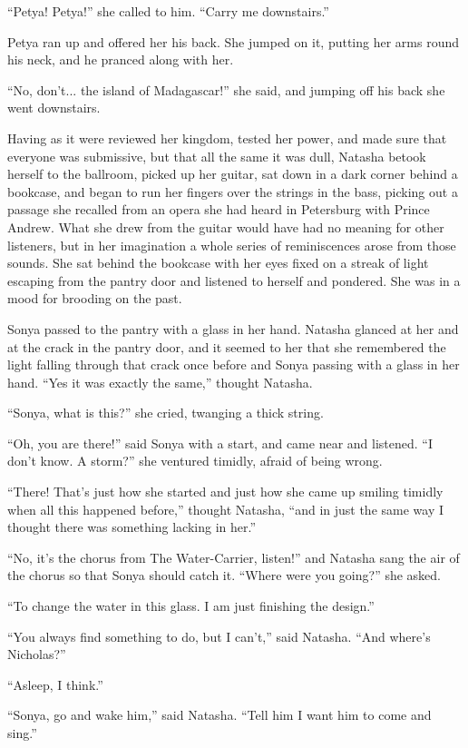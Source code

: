 ``Petya! Petya!'' she called to him. ``Carry me downstairs.''

Petya ran up and offered her his back. She jumped on it, putting
her arms round his neck, and he pranced along with her.

``No, don't... the island of Madagascar!'' she said, and jumping
off his back she went downstairs.

Having as it were reviewed her kingdom, tested her power, and
made sure that everyone was submissive, but that all the same it
was dull, Natasha betook herself to the ballroom, picked up her
guitar, sat down in a dark corner behind a bookcase, and began to
run her fingers over the strings in the bass, picking out a
passage she recalled from an opera she had heard in Petersburg
with Prince Andrew. What she drew from the guitar would have had
no meaning for other listeners, but in her imagination a whole
series of reminiscences arose from those sounds. She sat behind
the bookcase with her eyes fixed on a streak of light escaping
from the pantry door and listened to herself and pondered. She
was in a mood for brooding on the past.

Sonya passed to the pantry with a glass in her hand. Natasha
glanced at her and at the crack in the pantry door, and it seemed
to her that she remembered the light falling through that crack
once before and Sonya passing with a glass in her hand. ``Yes it
was exactly the same,'' thought Natasha.

``Sonya, what is this?'' she cried, twanging a thick string.

``Oh, you are there!'' said Sonya with a start, and came near and
listened. ``I don't know. A storm?'' she ventured timidly, afraid
of being wrong.

``There! That's just how she started and just how she came up
smiling timidly when all this happened before,'' thought Natasha,
``and in just the same way I thought there was something lacking
in her.''

``No, it's the chorus from The Water-Carrier, listen!'' and
Natasha sang the air of the chorus so that Sonya should catch
it. ``Where were you going?'' she asked.

``To change the water in this glass. I am just finishing the
design.''

``You always find something to do, but I can't,'' said
Natasha. ``And where's Nicholas?''

``Asleep, I think.''

``Sonya, go and wake him,'' said Natasha. ``Tell him I want him
to come and sing.''

